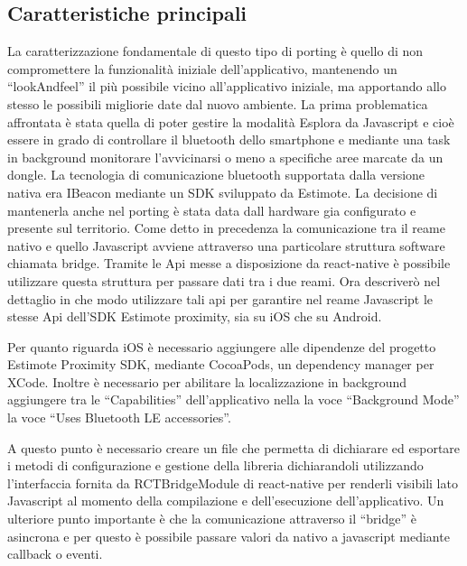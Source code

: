 \subsection{Caratteristiche principali}\vspace{5mm}

La caratterizzazione fondamentale di questo tipo di porting è quello di non compromettere la funzionalità iniziale dell’applicativo, mantenendo un “lookAndfeel” il più possibile vicino all’applicativo iniziale, ma apportando allo stesso le possibili migliorie date dal nuovo ambiente. La prima problematica affrontata è stata quella di poter gestire la modalità Esplora da Javascript e cioè essere in grado di controllare il bluetooth dello smartphone e mediante una task in background monitorare l’avvicinarsi o meno a specifiche aree marcate da un dongle. La tecnologia di comunicazione bluetooth supportata dalla versione nativa era IBeacon mediante un SDK sviluppato da Estimote. La decisione di mantenerla anche nel porting è stata data dall hardware gia configurato e presente sul territorio. Come detto in precedenza la comunicazione tra il reame nativo e quello Javascript avviene attraverso una particolare struttura software chiamata bridge. Tramite le Api messe a disposizione da react-native è possibile utilizzare questa struttura per passare dati tra i due reami. Ora descriverò nel dettaglio in che modo utilizzare tali api per garantire nel reame Javascript le stesse Api dell’SDK Estimote proximity, sia su iOS che su Android.\vspace{5mm}

Per quanto riguarda iOS è necessario aggiungere alle dipendenze del progetto Estimote Proximity SDK, mediante CocoaPods, un dependency manager per XCode. Inoltre è necessario per abilitare la localizzazione in background aggiungere tra le “Capabilities” dell’applicativo nella la voce “Background Mode” la voce “Uses Bluetooth LE accessories”. \vspace{5mm}

A questo punto è necessario creare un file che permetta di dichiarare ed esportare i metodi di configurazione e gestione della libreria dichiarandoli utilizzando l’interfaccia fornita da RCTBridgeModule  di react-native per renderli visibili lato Javascript al momento della compilazione e dell’esecuzione dell’applicativo. Un ulteriore punto importante è che la comunicazione attraverso il “bridge” è asincrona e per questo è possibile passare valori da nativo a javascript mediante callback o eventi. \vspace{5mm}


